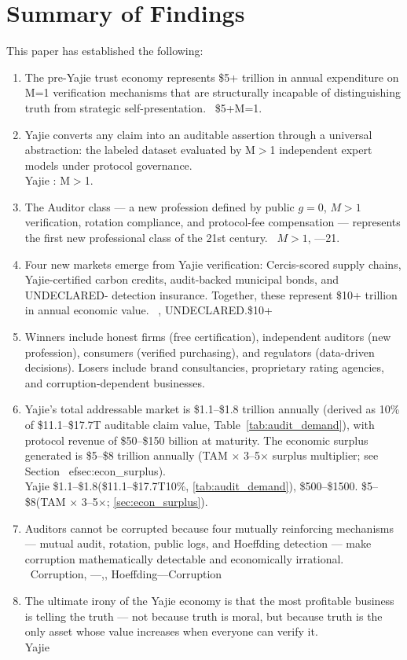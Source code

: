 \documentclass[12pt,a4paper]{article}
\theoremstyle{remark}
\begin{document}
\section{Summary of Findings}
This paper has established the following:
\begin{enumerate}[leftmargin=*, itemsep=6pt]
 \item The pre-Yajie trust economy represents \$5+ trillion in annual expenditure on 
 M=1 verification mechanisms that are structurally incapable of distinguishing 
 truth from strategic self-presentation. \
 \$5+M=1.
 \item Yajie converts any claim into an auditable assertion through a universal 
 abstraction: the labeled dataset evaluated by M$>$1 independent expert models 
 under protocol governance. \\ \small Yajie
 : M$>$1.
 \item The Auditor class --- a new profession defined by public $g=0$, $M>1$ verification, 
 rotation compliance, and protocol-fee compensation --- represents the first new 
 professional class of the 21st century. \
 $M>1$, ---21.
 \item Four new markets emerge from Yajie verification: Cercis-scored supply chains, 
 Yajie-certified carbon credits, audit-backed municipal bonds, and UNDECLARED-
 detection insurance. Together, these represent \$10+ trillion in annual economic 
 value. \
, UNDECLARED.\$10+
 \item Winners include honest firms (free certification), independent auditors 
 (new profession), consumers (verified purchasing), and regulators (data-driven 
 decisions). Losers include brand consultancies, proprietary rating agencies, and 
 corruption-dependent businesses. \
 \item Yajie's total addressable market is \$1.1--\$1.8 trillion annually (derived as 
 10\% of \$11.1--\$17.7T auditable claim value, Table~\ref{tab:audit_demand}), with 
 protocol revenue of \$50--\$150 billion at maturity. The economic surplus 
 generated is \$5--\$8 trillion annually (TAM $\times$ 3--5$\times$ surplus 
 multiplier; see Section~
ef{sec:econ_surplus}). \\ \small Yajie
 \$1.1--\$1.8(\$11.1--\$17.7T10\%, 
 \ref{tab:audit_demand}), \$500--\$1500.
 \$5--\$8(TAM $\times$ 3--5$\times$; 
 \ref{sec:econ_surplus}).
 \item Auditors cannot be corrupted because four mutually reinforcing mechanisms --- 
 mutual audit, rotation, public logs, and Hoeffding detection --- make corruption 
 mathematically detectable and economically irrational. \
 Corruption, ---,, Hoeffding---Corruption
 \item The ultimate irony of the Yajie economy is that the most profitable business 
 is telling the truth --- not because truth is moral, but because truth is the 
 only asset whose value increases when everyone can verify it. \\ \small Yajie
\end{enumerate}
\end{document}
